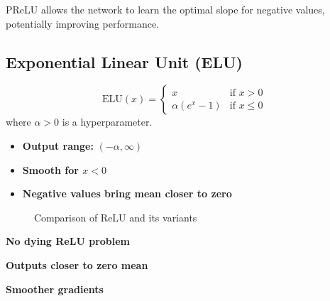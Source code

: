 \begin{note}
PReLU allows the network to learn the optimal slope for negative values, potentially improving performance.
\end{note}

\subsection{Exponential Linear Unit (ELU)}

\begin{equation}
\text{ELU}(x) = 
\begin{cases}
x & \text{if } x > 0 \\
\alpha(e^x - 1) & \text{if } x \leq 0
\end{cases}
\end{equation}
where $\alpha > 0$ is a hyperparameter.

\begin{properties}
\begin{itemize}
    \item \textbf{Output range:} $(-\alpha, \infty)$
    \item \textbf{Smooth for $x < 0$}
    \item \textbf{Negative values bring mean closer to zero}
\end{itemize}
\end{properties}

\begin{figure}[htbp]
    \centering
    \caption[Comparison of ReLU variants]{Comparison of ReLU and its variants}
    \label{fig:relu_variants}
\end{figure}

\begin{advantages}
    \item \textbf{No dying ReLU problem}
    \item \textbf{Outputs closer to zero mean}
    \item \textbf{Smoother gradients}
\end{advantages}

